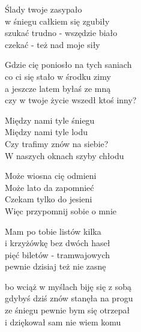 \begin{text}
    Ślady twoje zasypało\\
    w śniegu całkiem się zgubiły\\
    szukać trudno - wszędzie biało\\
    czekać - też nad moje siły

    Gdzie cię poniosło na tych saniach\\
    co ci się stało w środku zimy\\
    a jeszcze latem byłaś ze mną\\
    czy w twoje życie wszedł ktoś inny?

    \vin Między nami tyle śniegu\\
    \vin Między nami tyle lodu\\
    \vin Czy trafimy znów na siebie?\\
    \vin W naszych oknach szyby chłodu

    \vin Może wiosna cię odmieni\\
    \vin Może lato da zapomnieć\\
    \vin Czekam tylko do jesieni\\
    \vin Więc przypomnij sobie o mnie

    Mam po tobie listów kilka\\
    i krzyżówkę bez dwóch haseł\\
    pięć biletów - tramwajowych\\
    pewnie dzisiaj też nie zasnę

    bo wciąż w myślach biję się z sobą\\
    gdybyś dziś znów stanęła na progu\\
    ze śniegu pewnie bym się otrzepał\\
    i dziękował sam nie wiem komu
\end{text}
\begin{chord}

\end{chord}